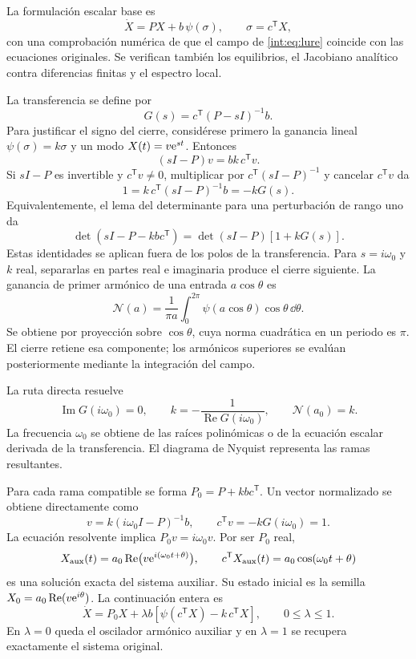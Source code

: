 La formulación escalar base es
\begin{equation}
  \dot X=PX+b\,\psi(\sigma),\qquad
  \sigma=c^{\mathsf T}X,
  \label{int:eq:lure}
\end{equation}
con una comprobación numérica de que el campo de \eqref{int:eq:lure} coincide con
las ecuaciones originales. Se verifican también los equilibrios, el Jacobiano
analítico contra diferencias finitas y el espectro local.

La transferencia se define por
\begin{equation}
  G(s)=c^{\mathsf T}(P-sI)^{-1}b.
  \label{int:eq:transfer}
\end{equation}
Para justificar el signo del cierre, considérese primero la ganancia lineal
\(\psi(\sigma)=k\sigma\) y un modo \(X(t)=v\mathrm e^{st}\). Entonces
\[
 (sI-P)v=bk\,c^{\mathsf T}v.
\]
Si \(sI-P\) es invertible y \(c^{\mathsf T}v\ne0\), multiplicar por
\(c^{\mathsf T}(sI-P)^{-1}\) y cancelar \(c^{\mathsf T}v\) da
\[
 1=k\,c^{\mathsf T}(sI-P)^{-1}b=-kG(s).
\]
Equivalentemente, el lema del determinante para una perturbación de rango uno
da
\[
 \det(sI-P-kbc^{\mathsf T})=\det(sI-P)[1+kG(s)].
\]
Estas identidades se aplican fuera de los polos de la transferencia. Para
\(s=i\omega_0\) y \(k\) real, separarlas en partes real e imaginaria
produce el cierre siguiente. La ganancia de primer armónico de una entrada
\(a\cos\theta\) es
\[
 \mathcal N(a)=\frac1{\pi a}\int_0^{2\pi}
                   \psi(a\cos\theta)\cos\theta\,\dd\theta.
\]
Se obtiene por proyección sobre \(\cos\theta\), cuya norma cuadrática en
un periodo es \(\pi\). El cierre retiene esa componente; los armónicos
superiores se evalúan posteriormente mediante la integración del campo.

La ruta directa resuelve
\begin{equation}
  \operatorname{Im}G(i\omega_0)=0,\qquad
  k=-\frac{1}{\operatorname{Re}G(i\omega_0)},\qquad
  \mathcal N(a_0)=k.
  \label{int:eq:balance}
\end{equation}
La frecuencia \(\omega_0\) se obtiene de las raíces polinómicas o de la
ecuación escalar derivada de la transferencia. El diagrama de Nyquist
representa las ramas resultantes.

Para cada rama compatible se forma \(P_0=P+kbc^{\mathsf T}\). Un vector
normalizado se obtiene directamente como
\[
 v=k(i\omega_0I-P)^{-1}b,\qquad
 c^{\mathsf T}v=-kG(i\omega_0)=1.
\]
La ecuación resolvente implica \(P_0v=i\omega_0v\). Por ser \(P_0\) real,
\[
 X_{\rm aux}(t)=a_0\operatorname{Re}
       \bigl(v\mathrm e^{i(\omega_0t+\theta)}\bigr),\qquad
 c^{\mathsf T}X_{\rm aux}(t)=a_0\cos(\omega_0t+\theta)
\]
es una solución exacta del sistema auxiliar. Su estado inicial es la semilla
\(X_0=a_0\operatorname{Re}(v\mathrm e^{i\theta})\). La continuación entera es
\begin{equation}
  \dot X=P_0X+\lambda b
  \left[\psi(c^{\mathsf T}X)-k\,c^{\mathsf T}X\right],
  \qquad 0\leq\lambda\leq1.
  \label{int:eq:homotopy}
\end{equation}
En $\lambda=0$ queda el oscilador armónico auxiliar y en $\lambda=1$ se
recupera exactamente el sistema original.

